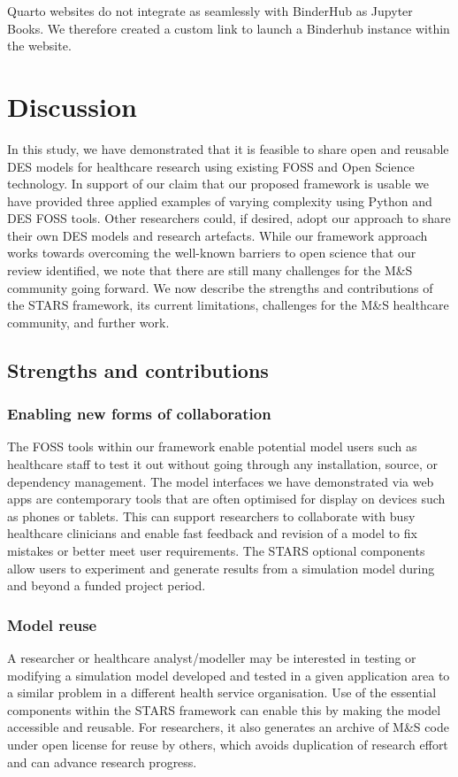 \documentclass[]{interact}
\theoremstyle{plain}%
\theoremstyle{definition}
\theoremstyle{remark}
\begin{document}
Quarto websites do not integrate as seamlessly with BinderHub as Jupyter Books.  We therefore created a custom link to launch a Binderhub instance within the website.







\section{Discussion}

In this study, we have demonstrated that it is feasible to share open and reusable DES models for healthcare research using existing FOSS and Open Science technology. In support of our claim that our proposed framework is usable we have provided three applied examples of varying complexity using Python and DES FOSS tools. Other researchers could, if desired, adopt our approach to share their own DES models and research artefacts. While our framework approach works towards overcoming the well-known barriers to open science that our review identified, we note that there are still many challenges for the M\&S community going forward. We now describe the strengths and contributions of the STARS framework, its current limitations, challenges for the M\&S healthcare community, and further work.

\subsection{Strengths and contributions}
 
\subsubsection{Enabling new forms of collaboration}
The FOSS tools within our framework enable potential model users such as healthcare staff to test it out without going
through any installation, source, or dependency management. The model interfaces we have demonstrated via web apps are contemporary tools that are often optimised for display on devices such as phones or tablets. This can support researchers to collaborate with busy healthcare clinicians and enable fast feedback and revision of a model to fix mistakes or better meet user requirements. The STARS optional components allow users to experiment and generate results from a simulation model during and beyond a funded project period. 

\subsubsection{Model reuse}
A researcher or healthcare analyst/modeller may be interested in testing or modifying a simulation model developed and tested in a given application area to a similar problem in a different health service organisation. Use of the essential components within the STARS framework can enable this by making the model accessible and reusable. For researchers, it also generates an archive of M\&S code under open license for reuse by others, which avoids duplication of research effort and can advance research progress. 
\end{document}
